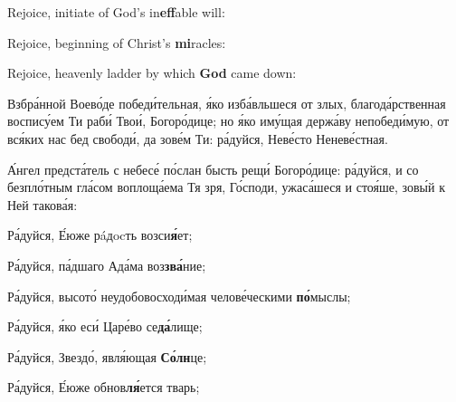 

\PeopleRejoice Rejoice, initiate of God's in\textbf{eff}able will:


Rejoice, beginning of Christ's \textbf{mi}racles:


Rejoice, heavenly ladder by which \textbf{God} came down:


\pagebreak


Взбра́нной Воево́де победи́тельная, я́ко изба́вльшеся от злых, благода́рственная воспису́ем Ти раби́ Твои́, Богоро́дице; но я́ко иму́щая держа́ву непобеди́мую, от вся́ких нас бед свободи́, да зове́м Ти: ра́дуйся, Неве́сто Неневе́стная.


\Ierei А́нгел предста́тель с небесе́ по́слан бысть рещи́ Богоро́дице: ра́дуйся, и со безпло́тным гла́сом воплоща́ема Тя зря, Го́споди, ужаса́шеся и стоя́ше, зовы́й к Ней такова́я:

\KhorRaduisya Ра́дуйся, Е́юже рáдocть возси\textbf{я́}ет;


Ра́дуйся, па́дшаго Ада́ма воз\textbf{зва́}ние;


Ра́дуйся, высото́ неудобовосходи́мая челове́ческими \textbf{по́}мыслы;


Ра́дуйся, я́ко еси́ Царе́во се\textbf{да́}лище;


Ра́дуйся, Звездо́, явля́ющая \textbf{Со́лн}це;


Ра́дуйся, Е́юже обнов\textbf{ля́}ется тварь;

